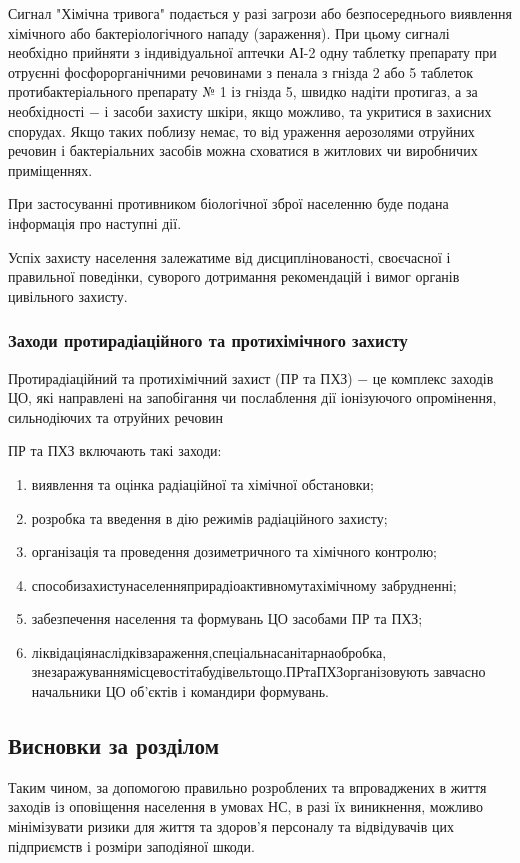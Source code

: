 Сигнал "Хімічна тривога" подається у разі загрози або безпосереднього виявлення хімічного або бактеріологічного нападу (зараження). При цьому сигналі необхідно прийняти з індивідуальної аптечки АІ-2 одну таблетку препарату при отруєнні фосфорорганічними речовинами з пенала з гнізда 2 або 5 таблеток протибактеріального препарату № 1 із гнізда 5, швидко надіти протигаз, а за необхідності $-$ і засоби захисту шкіри, якщо можливо, та укритися в захисних спорудах. Якщо таких поблизу немає, то від ураження аерозолями отруйних речовин і бактеріальних засобів можна сховатися в житлових чи виробничих приміщеннях.

При застосуванні противником біологічної зброї населенню буде подана інформація про наступні дії.

Успіх захисту населення залежатиме від дисциплінованості, своєчасної і правильної поведінки, суворого дотримання рекомендацій і вимог органів цивільного захисту.

\subsubsection{Заходи протирадіаційного та протихімічного захисту}

Протирадіаційний та протихімічний захист (ПР та ПХЗ) $-$ це комплекс заходів ЦО, які направлені на запобігання чи послаблення дії іонізуючого опромінення, сильнодіючих та отруйних речовин

ПР та ПХЗ включають такі заходи:

\begin{enumerate}
	\item виявлення та оцінка радіаційної та хімічної обстановки;
	\item розробка та введення в дію режимів радіаційного захисту;
	\item організація та проведення дозиметричного та хімічного контролю;
	\item способи\hfill захисту\hfill населення\hfill при\hfill радіоактивному\hfill та\hfill хімічному\newline \hspace*{-20mm} забрудненні;
	\item забезпечення населення та формувань ЦО засобами ПР та ПХЗ;
	\item ліквідація\hfill наслідків\hfill зараження,\hfill спеціальна\hfill санітарна\hfill обробка,\newline \hspace*{-20mm} знезаражування\hfill місцевості\hfill та\hfill будівель\hfill тощо.\hfill ПР\hfill та\hfill ПХЗ\hfill організовують\newline \hspace*{-20mm} завчасно начальники ЦО об’єктів і командири формувань.
\end{enumerate}

\subsection{Висновки за розділом}

Таким чином, за допомогою правильно розроблених та впроваджених в життя заходів із оповіщення населення в умовах НС, в разі їх виникнення, можливо мінімізувати ризики для життя та здоров’я персоналу та відвідувачів цих підприємств і розміри заподіяної шкоди. 
